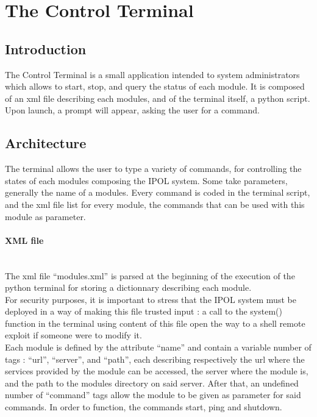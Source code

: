 \section{The Control Terminal}

\subsection{Introduction}
The Control Terminal is a small application intended to system administrators which allows to start, stop, and query the status of each module. It is composed of an xml file describing each modules, and of the terminal itself, a python script. \\
Upon launch, a prompt will appear, asking the user for a command.

\subsection{Architecture}
The terminal allows the user to type a variety of commands, for controlling the states of each modules composing the IPOL system. Some take parameters, generally the name of a modules. Every command is coded in the terminal script, and the xml file list for every module, the commands that can be used with this module as parameter.

\paragraph{XML file} \hspace{0pt} \\
The xml file ``modules.xml'' is parsed at the beginning of the execution of the python terminal for storing a dictionnary describing each module. \\
For security purposes, it is important to stress that the IPOL system must be deployed in a way of making this file trusted input : a call to the system() function in the terminal using content of this file open the way to a shell remote exploit if someone were to modify it. \\
Each module is defined by the attribute ``name'' and contain a variable number of tags : ``url'', ``server'', and ``path'', each describing respectively the url where the services provided by the module can be accessed, the server where the module is, and the path to the modules directory on said server. After that, an undefined number of ``command'' tags allow the module to be given as parameter for said commands. In order to function, the commands start, ping and shutdown.

